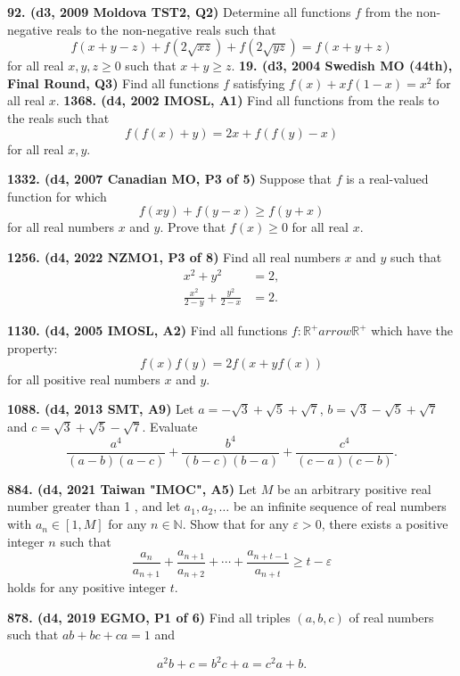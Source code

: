 \documentclass{article}
\begin{document}
\textbf{92. (\color{red}d3\color{black}, 2009 Moldova TST2, Q2)} Determine all functions \(f\) from the non-negative reals to the non-negative reals such that
\[f(x+y-z) + f(2\sqrt{xz}) + f(2\sqrt{yz}) = f(x+y+z)\]
for all real \(x,y,z \geq 0\) such that \(x + y \geq z\).
\textbf{19. (\color{red}d3\color{black}, 2004 Swedish MO (44th), Final Round, Q3)} Find all functions $f$ satisfying $f(x)+x f(1-x) = x^2$ for all real $x$.
\textbf{1368. (\color{red}d4\color{black}, 2002 IMOSL, A1)} Find all functions from the reals to the reals such that $$f(f(x)+y) = 2x + f(f(y)-x)$$ for all real $x,y$.

\textbf{1332. (\color{red}d4\color{black}, 2007 Canadian MO, P3 of 5)} Suppose that $f$ is a real-valued function for which
\[
    f(xy) + f(y - x) \geq f(y + x)
\]
for all real numbers $x$ and $y$. Prove that $f(x) \geq 0$ for all real $x.$

\textbf{1256. (\color{red}d4\color{black}, 2022 NZMO1, P3 of 8)} Find all real numbers \(x\) and \(y\) such that
\begin{align*}
    x^2 + y^2                         & = 2, \\
    \frac{x^2}{2-y} + \frac{y^2}{2-x} & = 2.
\end{align*}

\textbf{1130. (\color{red}d4\color{black}, 2005 IMOSL, A2)} Find all functions $f: \mathbb{R}^{+} arrow \mathbb{R}^{+}$ which have the property:
$$
    f(x) f(y)=2 f(x+y f(x))
$$
for all positive real numbers $x$ and $y$.

\textbf{1088. (\color{red}d4\color{black}, 2013 SMT, A9)} Let $a=-\sqrt{3}+\sqrt{5}+\sqrt{7}$, $b=\sqrt{3}-\sqrt{5}+\sqrt{7}$ and $c=\sqrt{3}+\sqrt{5}-\sqrt{7}$. Evaluate $$\frac{a^4}{(a-b)(a-c)}+\frac{b^4}{(b-c)(b-a)}+\frac{c^4}{(c-a)(c-b)}.$$

\textbf{884. (\color{red}d4\color{black}, 2021 Taiwan "IMOC", A5)} Let $M$ be an arbitrary positive real number greater than 1 , and let $a_{1}, a_{2}, \ldots$ be an infinite sequence of real numbers with $a_{n} \in[1, M]$ for any $n \in \mathbb{N}$. Show that for any $\varepsilon>0$, there exists a positive integer $n$ such that
$$
    \frac{a_{n}}{a_{n+1}}+\frac{a_{n+1}}{a_{n+2}}+\cdots+\frac{a_{n+t-1}}{a_{n+t}} \geq t-\varepsilon
$$
holds for any positive integer $t$.

\textbf{878. (\color{red}d4\color{black}, 2019 EGMO, P1 of 6)} Find all triples $(a, b, c)$ of real numbers such that $ab + bc + ca = 1$ and

$$a^2b + c = b^2c + a = c^2a + b.$$
\end{document}
